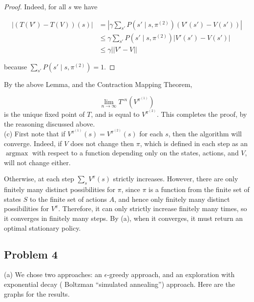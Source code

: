 \documentclass[12pt]{article}
\DeclareMathOperator{\argmax}{argmax}
\theoremstyle{remark}
\begin{document}
\begin{proof}

Indeed, for all $s$ we have

\begin{align*}
|(T(V')-T(V))(s)| & = |\gamma \sum_{s'} P(s' \mid s, \pi^{(2)}) (V'(s') - V(s'))| \\
&\leq \gamma \sum_{s'} P(s' \mid s, \pi^{(2)}) |V'(s')-V(s')| \\
&\leq \gamma ||V'-V||
\end{align*}

because $\sum_{s'} P(s' \mid s, \pi^{(2)}) = 1$.

\end{proof}


By the above Lemma, and the Contraction Mapping Theorem,

\[
\lim_{n \rightarrow \infty} T^{\circ n}(V^{\pi^{(1)}})
\]
is the unique fixed point of $T$, and is equal to $V^{\pi^{(2)}}$. This completes the proof, by the reasoning discussed above. \\


\noindent (c) First note that if $V^{\pi^{(1)}}(s) = V^{\pi^{(2)}}(s)$ for each $s$, then the algorithm will converge. Indeed, if $V$ does not change then $\pi$, which is defined in each step as an $\argmax$ with respect to a function depending only on the states, actions, and $V$, will not change either.


Otherwise, at each step $\sum_s V^{\pi}(s)$ strictly increases. However, there are only finitely many distinct possibilities for $\pi$, since $\pi$ is a function from the finite set of states $S$ to the finite set of actions $A$, and hence only finitely many distinct possibilities for $V^{\pi}$. Therefore, it can only strictly increase finitely many times, so it converges in finitely many steps. By (a), when it converges, it must return an optimal stationary policy. 




\subsection*{Problem 4} (a) We chose two approaches: an $\epsilon$-greedy approach, and an exploration with exponential decay ( Boltzman ``simulated annealing'')  approach. Here are the graphs for the results. 
\end{document}
